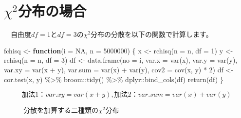 \documentclass[a4paper]{tufte-handout}
\newenvironment{Shaded}{}{}
\newcommand{\AttributeTok}[1]{\textcolor[rgb]{0.49,0.56,0.16}{#1}}
\newcommand{\ConstantTok}[1]{\textcolor[rgb]{0.53,0.00,0.00}{#1}}
\newcommand{\ControlFlowTok}[1]{\textcolor[rgb]{0.00,0.44,0.13}{\textbf{#1}}}
\newcommand{\DecValTok}[1]{\textcolor[rgb]{0.25,0.63,0.44}{#1}}
\newcommand{\FunctionTok}[1]{\textcolor[rgb]{0.02,0.16,0.49}{#1}}
\newcommand{\NormalTok}[1]{#1}
\newcommand{\OtherTok}[1]{\textcolor[rgb]{0.00,0.44,0.13}{#1}}
\newcommand{\SpecialCharTok}[1]{\textcolor[rgb]{0.25,0.44,0.63}{#1}}
\begin{document}
\newpage

\hypertarget{chi2ux5206ux5e03ux306eux5834ux5408}{%
\section{\texorpdfstring{\textbf{\(\chi^2\)分布の場合}}{\textbackslash chi\^{}2分布の場合}}\label{chi2ux5206ux5e03ux306eux5834ux5408}}

　自由度\(df = 1\)と\(df = 3\)の\(\chi^2\)分布の分散を以下の関数で計算します。

\begin{Shaded}
\begin{Highlighting}[numbers=left,,]
\NormalTok{fchisq }\OtherTok{\textless{}{-}} \ControlFlowTok{function}\NormalTok{(}\AttributeTok{i =} \ConstantTok{NA}\NormalTok{, }\AttributeTok{n =} \DecValTok{5000000}\NormalTok{) \{}
\NormalTok{  x }\OtherTok{\textless{}{-}} \FunctionTok{rchisq}\NormalTok{(}\AttributeTok{n =}\NormalTok{ n, }\AttributeTok{df =} \DecValTok{1}\NormalTok{)}
\NormalTok{  y }\OtherTok{\textless{}{-}} \FunctionTok{rchisq}\NormalTok{(}\AttributeTok{n =}\NormalTok{ n, }\AttributeTok{df =} \DecValTok{3}\NormalTok{)}
\NormalTok{  df }\OtherTok{\textless{}{-}} \FunctionTok{data.frame}\NormalTok{(}\AttributeTok{no =}\NormalTok{ i,}
                   \AttributeTok{var.x =} \FunctionTok{var}\NormalTok{(x), }\AttributeTok{var.y =} \FunctionTok{var}\NormalTok{(y),}
                   \AttributeTok{var.xy =} \FunctionTok{var}\NormalTok{(x }\SpecialCharTok{+}\NormalTok{ y), }\AttributeTok{var.sum =} \FunctionTok{var}\NormalTok{(x) }\SpecialCharTok{+} \FunctionTok{var}\NormalTok{(y),}
                   \AttributeTok{cov2 =} \FunctionTok{cov}\NormalTok{(x, y) }\SpecialCharTok{*} \DecValTok{2}\NormalTok{)}
\NormalTok{  df }\OtherTok{\textless{}{-}} \FunctionTok{cor.test}\NormalTok{(x, y) }\SpecialCharTok{\%\textgreater{}\%}\NormalTok{ broom}\SpecialCharTok{::}\FunctionTok{tidy}\NormalTok{() }\SpecialCharTok{\%\textgreater{}\%}\NormalTok{ dplyr}\SpecialCharTok{::}\FunctionTok{bind\_cols}\NormalTok{(df)}
  \FunctionTok{return}\NormalTok{(df)}
\NormalTok{\}}
\end{Highlighting}
\end{Shaded}

\[\mbox{加法1：}var.xy = var(x + y),　\mbox{加法2：}var.sum = var(x) + var(y)\]

\begin{figure}

{\centering {}

}

\caption[分散を加算する二種類の$\chi^2$分布]{分散を加算する二種類の$\chi^2$分布}\label{fig:unnamed-chunk-7}
\end{figure}
\end{document}
